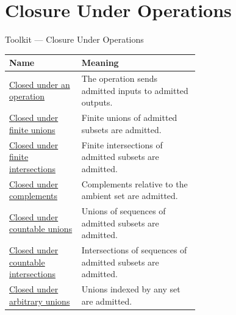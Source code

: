 \section{Closure Under Operations}

\begin{toolkitbox}{Toolkit --- Closure Under Operations}
\small
\begin{tabular}{l p{0.62\linewidth}}
\toprule
\textbf{Name} & \textbf{Meaning} \\
\midrule
\hyperref[def:closed-under-operation]{Closed under an operation} &
The operation sends admitted inputs to admitted outputs. \\
\hyperref[def:closed-under-finite-unions]{Closed under finite unions} &
Finite unions of admitted subsets are admitted. \\
\hyperref[def:closed-under-finite-intersections]{Closed under finite intersections} &
Finite intersections of admitted subsets are admitted. \\
\hyperref[def:closed-under-complements]{Closed under complements} &
Complements relative to the ambient set are admitted. \\
\hyperref[def:closed-under-countable-unions]{Closed under countable unions} &
Unions of sequences of admitted subsets are admitted. \\
\hyperref[def:closed-under-countable-intersections]{Closed under countable intersections} &
Intersections of sequences of admitted subsets are admitted. \\
\hyperref[def:closed-under-arbitrary-unions]{Closed under arbitrary unions} &
Unions indexed by any set are admitted. \\
\bottomrule
\end{tabular}
\end{toolkitbox}







